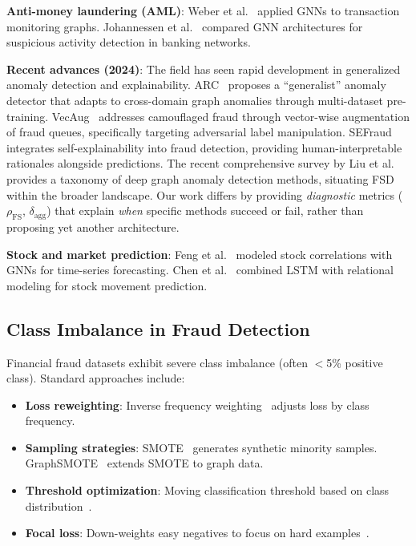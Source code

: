 \textbf{Anti-money laundering (AML)}: Weber et al.~\cite{weber2019aml} applied GNNs to transaction monitoring graphs. Johannessen et al.~\cite{johannessen2023aml_gnn} compared GNN architectures for suspicious activity detection in banking networks.

\textbf{Recent advances (2024)}: The field has seen rapid development in generalized anomaly detection and explainability. ARC~\cite{liu2024arc} proposes a ``generalist'' anomaly detector that adapts to cross-domain graph anomalies through multi-dataset pre-training. VecAug~\cite{zhang2024vecaug} addresses camouflaged fraud through vector-wise augmentation of fraud queues, specifically targeting adversarial label manipulation. SEFraud~\cite{yang2024sefraud} integrates self-explainability into fraud detection, providing human-interpretable rationales alongside predictions. The recent comprehensive survey by Liu et al.~\cite{liu2025graphanomalysurvey} provides a taxonomy of deep graph anomaly detection methods, situating FSD within the broader landscape. Our work differs by providing \textit{diagnostic} metrics ($\rho_{\text{FS}}$, $\delta_{\text{agg}}$) that explain \textit{when} specific methods succeed or fail, rather than proposing yet another architecture.

\textbf{Stock and market prediction}: Feng et al.~\cite{feng2019stock_gnn} modeled stock correlations with GNNs for time-series forecasting. Chen et al.~\cite{chen2018stock_lstm_gnn} combined LSTM with relational modeling for stock movement prediction.

\subsection{Class Imbalance in Fraud Detection}

Financial fraud datasets exhibit severe class imbalance (often $<$5\% positive class). Standard approaches include:
\begin{itemize}
\item \textbf{Loss reweighting}: Inverse frequency weighting~\cite{king2001imbalanced} adjusts loss by class frequency.
\item \textbf{Sampling strategies}: SMOTE~\cite{chawla2002smote} generates synthetic minority samples. GraphSMOTE~\cite{zhao2021graphsmote} extends SMOTE to graph data.
\item \textbf{Threshold optimization}: Moving classification threshold based on class distribution~\cite{zou2016threshold}.
\item \textbf{Focal loss}: Down-weights easy negatives to focus on hard examples~\cite{lin2017focal}.
\end{itemize}


